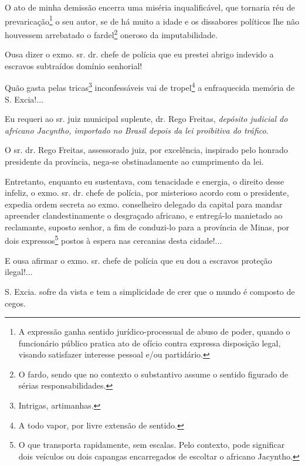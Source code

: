 O ato de minha demissão encerra uma miséria inqualificável, que tornaria
réu de prevaricação\footnote{A expressão ganha sentido
  jurídico-processual de abuso de poder, quando o funcionário público
  pratica ato de ofício contra expressa disposição legal, visando
  satisfazer interesse pessoal e/ou partidário.} o seu autor, se de há
muito a idade e os dissabores políticos lhe não houvessem arrebatado o
fardel\footnote{O fardo, sendo que no contexto o substantivo assume o
  sentido figurado de sérias responsabilidades.} oneroso da
imputabilidade.

Ousa dizer o exmo. sr. dr. chefe de polícia que eu prestei abrigo
indevido a escravos subtraídos domínio senhorial!

Quão gasta pelas tricas\footnote{Intrigas, artimanhas.} inconfessáveis
vai de tropel\footnote{A todo vapor, por livre extensão de sentido.} a
enfraquecida memória de S. Excia!...

Eu requeri ao sr. juiz municipal suplente, dr. Rego Freitas,
\emph{depósito judicial do africano Jacyntho, importado no Brasil depois
da lei proibitiva do tráfico}.

O sr. dr. Rego Freitas, assessorado juiz, por excelência, inspirado pelo
honrado presidente da província, nega-se obstinadamente ao cumprimento
da lei.

Entretanto, enquanto eu sustentava, com tenacidade e energia, o direito
desse infeliz, o exmo. sr. dr. chefe de polícia, por misterioso acordo
com o presidente, expedia ordem secreta ao exmo. conselheiro delegado da
capital para mandar apreender clandestinamente o desgraçado africano, e
entregá-lo manietado ao reclamante, suposto senhor, a fim de conduzi-lo
para a província de Minas, por dois expressos\footnote{O que
  transporta rapidamente, sem escalas. Pelo contexto, pode significar
  dois veículos ou dois capangas encarregados de escoltar o africano
  Jacyntho.} postos à espera nas cercanias desta cidade!...

E ousa afirmar o exmo. sr. chefe de polícia que eu dou a escravos
proteção ilegal!...

S. Excia. sofre da vista e tem a simplicidade de crer que o mundo é
composto de cegos.

